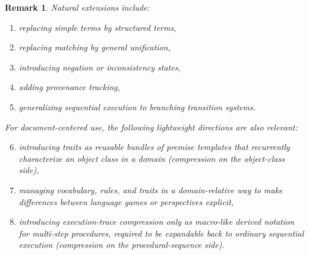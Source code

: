 \documentclass[11pt]{article}
\newtheorem{remark}[definition]{Remark}
\begin{document}
\begin{remark}
Natural extensions include:
\begin{enumerate}[label=\arabic*.]
\item replacing simple terms by structured terms,
\item replacing matching by general unification,
\item introducing negation or inconsistency states,
\item adding provenance tracking,
\item generalizing sequential execution to branching transition systems.
\end{enumerate}
For document-centered use, the following lightweight directions are also relevant:
\begin{enumerate}[label=\arabic*.]
\setcounter{enumi}{5}
\item introducing \emph{traits} as reusable bundles of premise templates that recurrently characterize an object class in a domain (compression on the object-class side),
\item managing vocabulary, rules, and traits in a domain-relative way to make differences between language games or perspectives explicit,
\item introducing execution-trace compression only as macro-like derived notation for multi-step procedures, required to be expandable back to ordinary sequential execution (compression on the procedural-sequence side).
\end{enumerate}
\end{remark}
\end{document}
